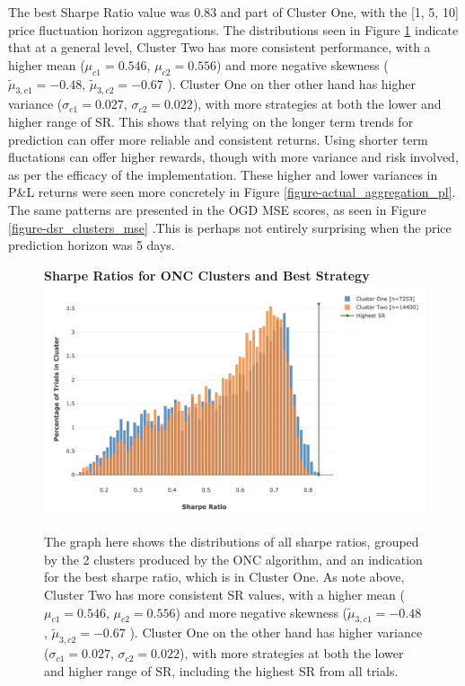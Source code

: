 \documentclass[a4paper,11pt,oneside]{article}
\theoremstyle{plain}
\theoremstyle{definition}
\begin{document}
	The best Sharpe Ratio value was 0.83 and part of Cluster One, with the [1, 5, 10] price fluctuation horizon aggregations. The distributions seen in Figure \ref{figure-dsr_clusters} indicate that at a general level, Cluster Two has more consistent performance, with a higher mean ($\mu_{c1} = 0.546$, $\mu_{c2} = 0.556$) and more negative skewness ($\tilde{\mu}_{3,c1} = -0.48$, $\tilde{\mu}_{3,c2} = -0.67$ ). Cluster One on ther other hand has higher variance ($\sigma_{c1} = 0.027$, $\sigma_{c2} = 0.022$), with more strategies at both the lower and higher range of SR. This shows that relying on the longer term trends for prediction can offer more reliable and consistent returns. Using shorter term fluctations can offer higher rewards, though with more variance and risk involved, as per the efficacy of the implementation. These higher and lower variances in P\&L returns were seen more concretely in Figure \ref{figure-actual_aggregation_pl}. The same patterns are presented in the OGD MSE scores, as seen in Figure \ref{figure-dsr_clusters_mse} .This is perhaps not entirely surprising when the price prediction horizon was 5 days.\newline

	\begin{figure}[H]
		\centering
		\textbf{Sharpe Ratios for ONC Clusters and Best Strategy}
		\includegraphics[scale=0.35]{images/results/dsr/cluster_distributions.png} 
		\caption[Sharpe Ratios for ONC Clusters and Best Strategy]{
			 The graph here shows the distributions of all sharpe ratios, grouped by the 2 clusters produced by the ONC algorithm, and an indication for the best sharpe ratio, which is in Cluster One. As note above, Cluster Two has more consistent SR values, with a higher mean ($\mu_{c1} = 0.546$, $\mu_{c2} = 0.556$) and more negative skewness ($\tilde{\mu}_{3,c1} = -0.48$, $\tilde{\mu}_{3,c2} = -0.67$ ). Cluster One on the other hand has higher variance ($\sigma_{c1} = 0.027$, $\sigma_{c2} = 0.022$), with more strategies at both the lower and higher range of SR, including the highest SR from all trials.}
		\label{figure-dsr_clusters}
	\end{figure}
\end{document}
